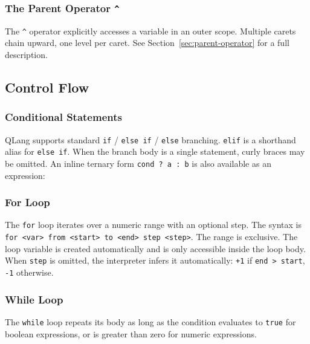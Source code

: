 \subsubsection{The Parent Operator \texttt{\^{}}}

The \texttt{\^{}} operator explicitly accesses a variable in an outer scope.
Multiple carets chain upward, one level per caret. See
Section~\ref{sec:parent-operator} for a full description.

\subsection{Control Flow}\label{sec:control-flow}

\subsubsection{Conditional Statements}

QLang supports standard \texttt{if} / \texttt{else if} / \texttt{else}
branching. \texttt{elif} is a shorthand alias for \texttt{else if}.
When the branch body is a single statement, curly braces may be omitted.
An inline ternary form \texttt{cond ? a : b} is also available as an
expression:




\subsubsection{For Loop}

The \texttt{for} loop iterates over a numeric range with an optional step.
The syntax is \texttt{for <var> from <start> to <end> step <step>}. The
range is exclusive. The loop variable is created
automatically and is only accessible inside the loop body. When
\texttt{step} is omitted, the interpreter infers it automatically:
\texttt{+1} if \texttt{end > start}, \texttt{-1} otherwise.



\subsubsection{While Loop}

The \texttt{while} loop repeats its body as long as the condition evaluates
to \texttt{true} for boolean expressions, or is greater than zero for numeric
expressions.

